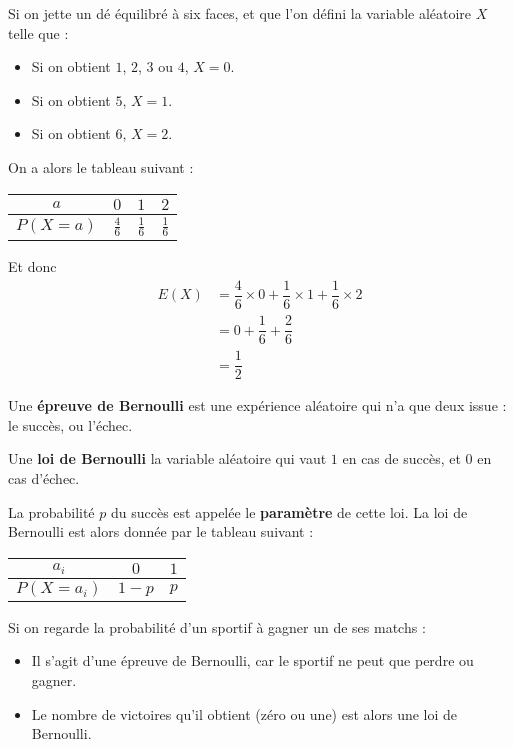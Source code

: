 \documentclass[
	classe=$1^{ere}STI2D$
]{coursclass}
\begin{document}
\begin{exemple}
	Si on jette un dé équilibré à six faces, et que l'on défini la variable aléatoire $X$ telle que :
	\begin{itemize}
		\item Si on obtient $1$, $2$, $3$ ou $4$, $X = 0$.
		\item Si on obtient $5$, $X = 1$.
		\item Si on obtient $6$, $X = 2$.
	\end{itemize}

	On a alors le tableau suivant :
	\begin{tabular}{|c|c|c|c|}
		\hline
		$a$        & $0$           & $1$           & $2$           \\ \hline
		$P(X = a)$ & $\frac{4}{6}$ & $\frac{1}{6}$ & $\frac{1}{6}$ \\ \hline
	\end{tabular}

	Et donc
	\begin{align*}
		E(X) & = \dfrac{4}{6}×0 + \dfrac{1}{6}×1 + \dfrac{1}{6}×2 \\
		     & = 0 + \dfrac{1}{6} + \dfrac{2}{6}                  \\
		     & = \dfrac{1}{2}
	\end{align*}
\end{exemple}

\begin{definition}
	Une \textbf{épreuve de Bernoulli} est une expérience aléatoire qui n'a que deux issue : le succès, ou l'échec.
\end{definition}

\begin{definition}
	Une \textbf{loi de Bernoulli} la variable aléatoire qui vaut $1$ en cas de succès, et $0$ en cas d'échec.

	La probabilité $p$ du succès est appelée le \textbf{paramètre} de cette loi. La loi de Bernoulli est alors donnée par le tableau suivant :
	\begin{center}
		\begin{tabular}{|c|c|c|}
			\hline
			$a_i$        & $0$     & $1$ \\ \hline
			$P(X = a_i)$ & $1 - p$ & $p$ \\ \hline
		\end{tabular}
	\end{center}
\end{definition}

\begin{exemple}
	Si on regarde la probabilité d'un sportif à gagner un de ses matchs :
	\begin{itemize}
		\item Il s'agit d'une épreuve de Bernoulli, car le sportif ne peut que perdre ou gagner.
		\item Le nombre de victoires qu'il obtient (zéro ou une) est alors une loi de Bernoulli.
	\end{itemize}
\end{exemple}
\end{document}
